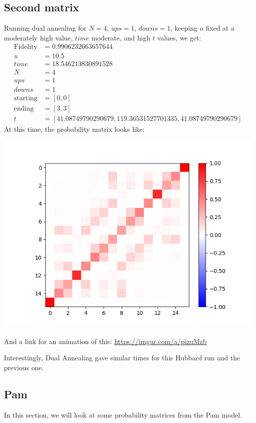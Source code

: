 \subsection{Second matrix}
Running dual annealing for $N=4$, $ups=1$, $downs=1$, keeping $u$ fixed at a moderately high value, $time$ moderate, and high $t$ values, we get:
\begin{align*}
    \text{Fidelity} &= 0.9906232663657644 \\
    u &= 10.5 \\
    time &= 18.546213830891528 \\
    N &= 4 \\
    ups &= 1 \\
    downs &= 1 \\
    \text{starting} &= [0,0] \\
    \text{ending} &= [3,3] \\
    t &= [41.08749790290679,119.36531527701335,41.08749790290679]
\end{align*}
At this time, the probability matrix looks like:
\begin{center}
    \includegraphics*[scale= 1]{HubbardSecondMatrixProbabilityMatrix.png}
\end{center}
And a link for an animation of this:
\url{https://imgur.com/a/pizuMzb}

Interestingly, Dual Annealing gave similar times for this Hubbard run and the previous one.

\subsection{Pam}
In this section, we will look at some probability matrices from the Pam model.

